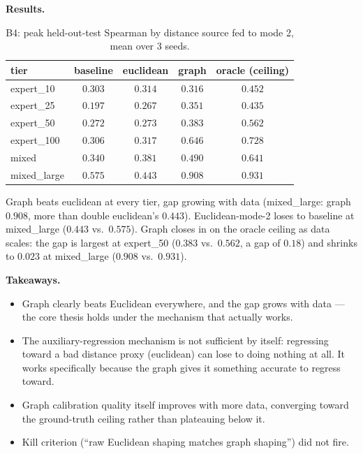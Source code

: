 \documentclass[11pt]{article}
\begin{document}
\textbf{Results.}

\begin{table}[h]
\centering
\small
\caption{B4: peak held-out-test Spearman by distance source fed to mode 2, mean over 3 seeds.}
\begin{tabular}{lcccc}
\toprule
tier & baseline & euclidean & \textbf{graph} & oracle (ceiling) \\
\midrule
expert\_10   & $0.303$ & $0.314$ & $0.316$ & $0.452$ \\
expert\_25   & $0.197$ & $0.267$ & $\mathbf{0.351}$ & $0.435$ \\
expert\_50   & $0.272$ & $0.273$ & $\mathbf{0.383}$ & $0.562$ \\
expert\_100  & $0.306$ & $0.317$ & $\mathbf{0.646}$ & $0.728$ \\
mixed        & $0.340$ & $0.381$ & $\mathbf{0.490}$ & $0.641$ \\
mixed\_large & $0.575$ & $0.443$ & $\mathbf{0.908}$ & $0.931$ \\
\bottomrule
\end{tabular}
\end{table}

Graph beats euclidean at every tier, gap growing with data (mixed\_large: graph $0.908$, more
than double euclidean's $0.443$). Euclidean-mode-2 loses to baseline at mixed\_large ($0.443$
vs.\ $0.575$). Graph closes in on the oracle ceiling as data scales: the gap is largest at
expert\_50 ($0.383$ vs.\ $0.562$, a gap of $0.18$) and shrinks to $0.023$ at mixed\_large
($0.908$ vs.\ $0.931$).

\textbf{Takeaways.}
\begin{itemize}[leftmargin=1.4em,itemsep=2pt]
\item Graph clearly beats Euclidean everywhere, and the gap grows with data --- the core thesis
holds under the mechanism that actually works.
\item The auxiliary-regression mechanism is not sufficient by itself: regressing toward a bad
distance proxy (euclidean) can lose to doing nothing at all. It works specifically because the
graph gives it something accurate to regress toward.
\item Graph calibration quality itself improves with more data, converging toward the
ground-truth ceiling rather than plateauing below it.
\item Kill criterion (``raw Euclidean shaping matches graph shaping'') did not fire.
\end{itemize}
\end{document}
